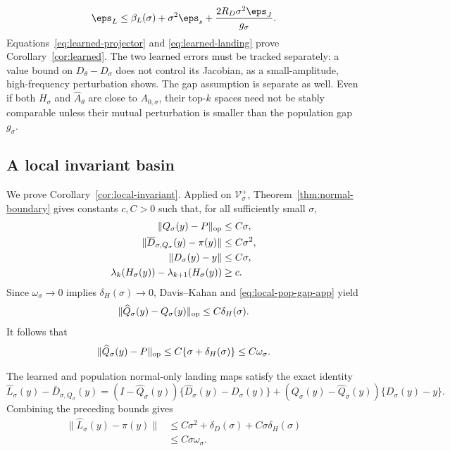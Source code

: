 \begin{equation}
  \eps_L
  \le\beta_L(\sigma)+\sigma^2\eps_s
  +\frac{2R_D\sigma^2\eps_J}{g_\sigma}.
  \label{eq:learned-landing}
\end{equation}
Equations~\eqref{eq:learned-projector} and \eqref{eq:learned-landing} prove Corollary~\ref{cor:learned}.  The two learned errors must be tracked separately: a value bound on $D_\theta-D_\sigma$ does not control its Jacobian, as a small-amplitude, high-frequency perturbation shows.  The gap assumption is separate as well.  Even if both $H_\sigma$ and $\widehat A_\theta$ are close to $A_{0,\sigma}$, their top-$k$ spaces need not be stably comparable unless their mutual perturbation is smaller than the population gap $g_\sigma$.

\subsection{A local invariant basin}
\label{app:local-invariant}

We prove Corollary~\ref{cor:local-invariant}.  Applied on
$\mathcal V_\sigma^+$, Theorem~\ref{thm:normal-boundary} gives constants
$c,C>0$ such that, for all sufficiently small $\sigma$,
\begin{align}
  \|Q_\sigma(y)-P\|_{\mathrm{op}}&\le C\sigma,\label{eq:local-pop-Q-app}\\
  \|\overline D_{\sigma,Q_\sigma}(y)-\pi(y)\|
  &\le C\sigma^2,\label{eq:local-pop-L-app}\\
  \|D_\sigma(y)-y\|&\le C\sigma,\label{eq:local-pop-D-app}\\
  \lambda_k(H_\sigma(y))-\lambda_{k+1}(H_\sigma(y))
  &\ge c.\label{eq:local-pop-gap-app}
\end{align}
Since $\omega_\sigma\to0$ implies $\delta_H(\sigma)\to0$,
Davis--Kahan and \eqref{eq:local-pop-gap-app} yield
\begin{equation}
  \|\widehat Q_\sigma(y)-Q_\sigma(y)\|_{\mathrm{op}}
  \le C\delta_H(\sigma).
\end{equation}
It follows that
\begin{equation}
  \|\widehat Q_\sigma(y)-P\|_{\mathrm{op}}
  \le C\{\sigma+\delta_H(\sigma)\}
  \le C\omega_\sigma.
  \label{eq:local-learned-Q-app}
\end{equation}

The learned and population normal-only landing maps satisfy the exact
identity
\begin{equation}
  \widehat L_\sigma(y)-\overline D_{\sigma,Q_\sigma}(y)
  =
  (I-\widehat Q_\sigma(y))
  \{\widehat D_\sigma(y)-D_\sigma(y)\}
  +(Q_\sigma(y)-\widehat Q_\sigma(y))
  \{D_\sigma(y)-y\}.
\end{equation}
Combining the preceding bounds gives
\begin{align}
  \|\widehat L_\sigma(y)-\pi(y)\|
  &\le
  C\sigma^2+\delta_D(\sigma)
  +C\sigma\delta_H(\sigma)\\
  &\le C\sigma\omega_\sigma.
  \label{eq:local-learned-L-app}
\end{align}

